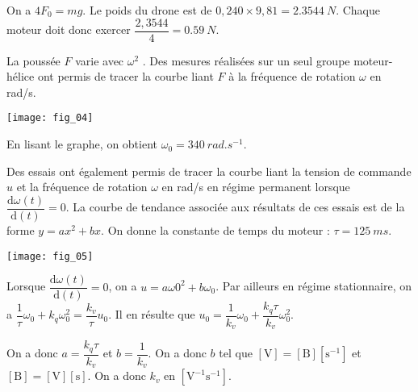 \begin{multicols}{2}
\ifprof
\begin{corrige}
On a  $4 F_0 = mg$. 
Le poids du drone est de $0,240\times 9,81 = \SI{2,3544}{N}$. Chaque moteur doit donc exercer $\dfrac{2,3544}{4}=\SI{0,59}{N}$.
\end{corrige}
\else
\fi
\ifprof
\else
La poussée $F$ varie avec $\omega^2$ . Des mesures réalisées sur un seul groupe moteur-hélice ont permis de tracer la courbe liant $F$ à la fréquence de rotation $\omega$ en rad/s.

\begin{center}
\texttt{[image: fig\_04]}
\end{center}

\fi

\ifprof
\begin{corrige}
En lisant le graphe, on obtient $\omega_0=\SI{340}{rad.s^{-1}}$.
\end{corrige}
\else
\fi

\ifprof
\else

Des essais ont également permis de tracer la
courbe liant la tension de commande $u$ et la
fréquence de rotation $\omega$ en rad/s en régime
permanent lorsque $\dfrac{\text{d}\omega(t)}{\text{d}(t)}=0$. La courbe de tendance associée aux résultats de
ces essais est de la forme $y=ax^2+bx$. On donne la constante de temps du moteur :
$\tau=\SI{125}{ms}$.

\begin{center}
\texttt{[image: fig\_05]}
\end{center}
\fi

\ifprof
\begin{corrige}
Lorsque $\dfrac{\text{d}\omega(t)}{\text{d}(t)}=0$, on a  $u=a\omega0^2+b\omega_0$. Par ailleurs en régime stationnaire, on a $\dfrac{1}{\tau}\omega_0 +k_q\omega_0^2 = \dfrac{k_v}{\tau}u_0$. Il en résulte que 
$u_0 = \dfrac{1}{k_v}\omega_0 +\dfrac{k_q\tau}{k_v} \omega_0^2$.

On a donc $a=\dfrac{k_q\tau}{k_v}$ et  $b=\dfrac{1}{k_v}$. On a donc $b$ tel que $[\text{V}]=[\text{B}][\text{s}^{-1}]$ et $[\text{B}]=[\text{V}][\text{s}]$. On a donc $k_v$ en $[\text{V}^{-1}\text{s}^{-1}]$.


\end{corrige}
\end{multicols}
